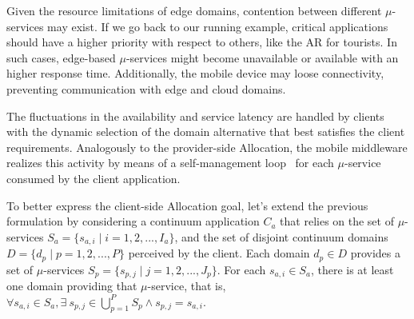 
Given the resource limitations of edge domains, contention between different $\mu$-services may exist. If we go back to our running example,
critical applications should have a higher priority with respect to others, like the AR for tourists. In such cases, edge-based $\mu$-services might become unavailable or available with an higher response time. Additionally, the mobile device may loose connectivity, preventing communication with edge and cloud domains. 




The fluctuations in the availability and service latency are handled by clients with the dynamic selection of the domain alternative that best satisfies the client requirements. Analogously to the provider-side Allocation, the mobile middleware realizes this activity by means of a self-management loop~\cite{kephart2003vision} for each $\mu$-service consumed by the client application.

To better express the client-side Allocation goal, let's extend the previous formulation by considering a continuum application $C_a$ that relies on the set of $\mu$-services $S_a = \{s_{a,i} \mid i = 1,2,...,I_a\}$, and the set of disjoint continuum domains $D = \{d_p \mid p = 1,2,...,P\}$ perceived by the client.
Each domain $d_p \in D$ provides a set of $\mu$-services $S_{p} = \{s_{p,j} \mid j =  1,2,..., J_p\}$. For each $s_{a,i} \in S_a$, there is at least one domain providing that $\mu$-service, that is, $\forall s_{a,i} \in S_a, \exists\ s_{p,j} \in \bigcup_{p=1}^{P} S_p \wedge s_{p,j} = s_{a,i}$. 

